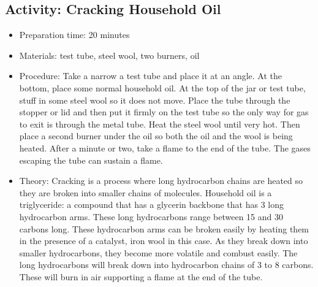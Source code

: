 \begin{itemize}
{\begin{itemize}
\begin{itemize}
{\subsection{Activity: Cracking Household Oil}
\begin{itemize}
\item{Preparation time: 20 minutes}
\item{Materials: test tube, steel wool, two burners, oil}
\item{Procedure: Take a narrow a test tube and place it at an angle. At the bottom, place some normal household oil. At the top of the jar or test tube, stuff in some steel wool so it does not move. Place the tube through the stopper or lid and then put it firmly on the test tube so the only way for gas to exit is through the metal tube. Heat the steel wool until very hot. Then place a second burner under the oil so both the oil and the wool is being heated. After a minute or two, take a flame to the end of the tube. The gases escaping the tube can sustain a flame.}
\item{Theory: Cracking is a process where long hydrocarbon chains are heated so they are broken into smaller chains of molecules. Household oil is a triglyceride: a compound that has a glycerin backbone that has 3 long hydrocarbon arms. These long hydrocarbons range between 15 and 30 carbons long. These hydrocarbon arms can be broken easily by heating them in the presence of a catalyst, iron wool in this case. As they break down into smaller hydrocarbons, they become more volatile and combust easily. The long hydrocarbons will break down into hydrocarbon chains of 3 to 8 carbons. These will burn in air supporting a flame at the end of the tube.}
\end{itemize}

}
\end{itemize}
\end{itemize}}
\end{itemize}
